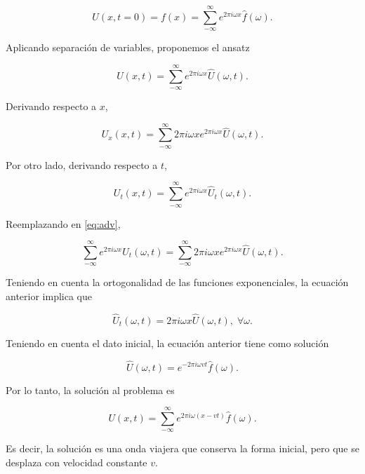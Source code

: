 \documentclass[12pt]{article}
\begin{document}
\begin{equation}
U(x,t=0) = f(x) = \sum_{-\infty}^{\infty} e^{2\pi i \omega x} \hat{f}(\omega).
\end{equation}

Aplicando separaci\'on de variables, proponemos el ansatz

\begin{equation}
U(x,t) =  \sum_{-\infty}^{\infty} e^{2\pi i \omega x} \hat{U}(\omega, t).
\end{equation}

Derivando respecto a $x$,

\begin{equation}
U_x(x,t) = \sum_{-\infty}^{\infty} 2\pi i \omega x e^{2\pi i \omega x} \hat{U}(\omega, t).
\end{equation}

Por otro lado, derivando respecto a $t$,

\begin{equation}
U_t(x,t) = \sum_{-\infty}^{\infty} e^{2\pi i \omega x} \hat{U}_t(\omega, t).
\end{equation}

Reemplazando en \ref{eq:adv},

\begin{equation}
\sum_{-\infty}^{\infty} e^{2\pi i \omega x} \hat{U}_t(\omega, t) = \sum_{-\infty}^{\infty} 2\pi i \omega x e^{2\pi i \omega x} \hat{U}(\omega, t).
\end{equation}

Teniendo en cuenta la ortogonalidad de las funciones exponenciales, la ecuaci\'on anterior implica que 

\begin{equation}
\hat{U}_t(\omega, t) = 2 \pi i \omega x \hat{U}(\omega, t), \;\forall \omega.
\end{equation}

Teniendo en cuenta el dato inicial, la ecuaci\'on anterior tiene como soluci\'on

\begin{equation}
\hat{U}(\omega, t) = e^{-2\pi i \omega v t} \hat{f}(\omega).
\end{equation}

Por lo tanto, la soluci\'on al problema es 

\begin{equation}
U(x,t) = \sum_{-\infty}^{\infty} e^{2\pi i \omega (x-vt)} \hat{f}(\omega).
\end{equation}

Es decir, la soluci\'on es una onda viajera que conserva la forma inicial, pero que se desplaza con velocidad constante $v$.
\end{document}
